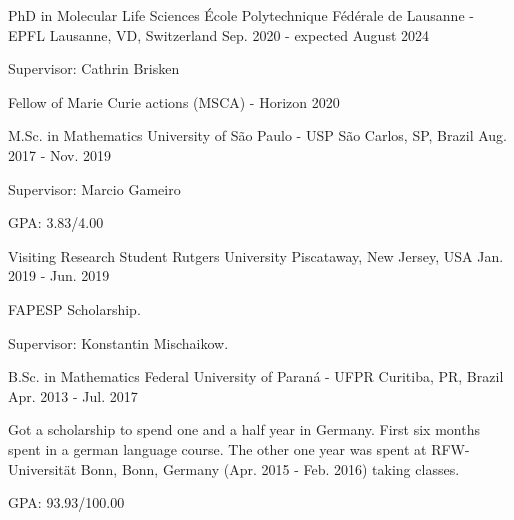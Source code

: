 

\begin{cventries}

  \cventry
    {PhD in Molecular Life Sciences} %
    {École Polytechnique Fédérale de Lausanne - EPFL} %
    {Lausanne, VD, Switzerland} %
    {Sep. 2020 - expected August 2024}
    {\begin{cvitems}
        \item{Supervisor: Cathrin Brisken}
        \item{Fellow of Marie Curie actions (MSCA) - Horizon 2020}
     \end{cvitems}
    }


  \cventry
    {M.Sc. in Mathematics} %
    {University of São Paulo - USP} %
    {São Carlos, SP, Brazil} %
    {Aug. 2017 - Nov. 2019}
    {
      \begin{cvitems} %
        \item{Supervisor: Marcio Gameiro}
        \item{GPA: 3.83/4.00}
      \end{cvitems}
    }

  \cventry
    {Visiting Research Student}
    {Rutgers University}
    {Piscataway, New Jersey, USA}
    {Jan. 2019 - Jun. 2019}
    {
      \begin{cvitems}
        \item{FAPESP Scholarship.}
        \item{Supervisor: Konstantin Mischaikow.}
      \end{cvitems}
    }

  \cventry
    {B.Sc. in Mathematics} %
    {Federal University of Paraná - UFPR} %
    {Curitiba, PR, Brazil} %
    {Apr. 2013 - Jul. 2017} %
    {
      \begin{cvitems} %
        \item{Got a scholarship to spend one and a half year in Germany.
              First six months spent in a german language course.
              The other one year was spent at RFW-Universität Bonn, Bonn, Germany
              (Apr. 2015 - Feb. 2016) taking classes.}
        \item{GPA: 93.93/100.00}
      \end{cvitems}
    }

\end{cventries}
